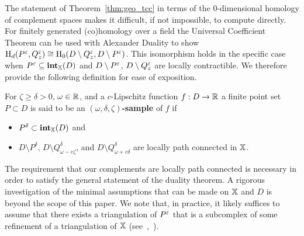 

The statement of Theorem~\ref{thm:geo_tcc} in terms of the $0$-dimensional homology of complement spaces makes it difficult, if not impossible, to compute directly.
For finitely generated (co)homology over a field the Universal Coefficient Theorem can be used with Alexander Duality to show $\mathrm{H}_d(P^\varepsilon,Q_z^\varepsilon)\cong\mathrm{H}_0(D\setminus Q_z^\varepsilon, D\setminus P^\varepsilon)$.
This isomorphism holds in the specific case when $P^\varepsilon\subseteq \mathbf{int}_{\mathbb{X}}(D)$ and $D\setminus P^\varepsilon$, $D\setminus Q_z^\varepsilon$ are locally contractible.
We therefore provide the following definition for ease of exposition.
\begin{definition}
  For $\zeta\geq \delta > 0$, $\omega\in\mathbb{R}$, and a $c$-Lipschitz function $f: D\to \mathbb{R}$ a finite point set $P\subset D$ is said to be an \textbf{$(\omega, \delta, \zeta)$-sample} of $f$ if \begin{itemize}
    \item $P^\delta\subset\mathbf{int}_{\mathbb{X}}(D)$ and
    \item $D\setminus P^\delta$, $D\setminus Q_{\omega-c\zeta}^\delta$, and $D\setminus Q_{\omega+c\delta}^\delta$ are locally path connected in $\mathbb{X}$.
  \end{itemize}
\end{definition}

The requirement that our complements are locally path connected is necessary in order to satisfy the general statement of the duality theorem.
A rigorous investigation of the minimal assumptions that can be made on $\mathbb{X}$ and $D$ is beyond the scope of this paper.
We note that, in practice, it likely suffices to assume that there exists a triangulation of $P^\varepsilon$ that is a subcomplex of some refinement of a triangulation of $\mathbb{X}$ (see~\cite{cavanna2017when},~\cite{julian83alexander}).

